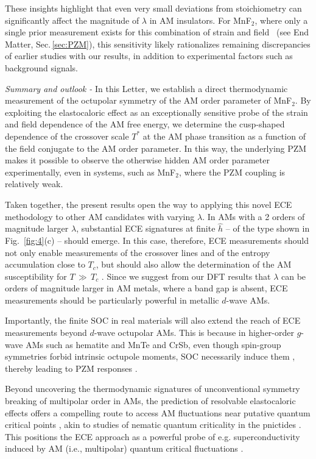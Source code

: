 \documentclass[
 reprint,










 amsmath,amssymb,
 aps,






]{revtex4-2}
\begin{document}
These insights highlight that even very small deviations from stoichiometry can significantly affect the magnitude of $\lambda$ in AM insulators. For MnF$_2$, where only a single prior measurement exists for this combination of strain and field~\cite{Bar88} (see End Matter, Sec.\,\ref{sec:PZM}), this sensitivity likely rationalizes remaining discrepancies of earlier studies with our results, in addition to experimental factors such as background signals.



\textit{Summary and outlook - } In this Letter, we establish a direct thermodynamic measurement of the octupolar symmetry of the AM order parameter of MnF$_2$. By exploiting the elastocaloric effect as an exceptionally sensitive probe of the strain and field dependence of the AM free energy, we determine the cusp-shaped dependence of the crossover scale $T^*$ at the AM phase transition as a function of the field conjugate to the AM order parameter. In this way, the underlying PZM makes it possible to observe the otherwise hidden AM order parameter experimentally, even in systems, such as MnF$_2$, where the PZM coupling is relatively weak.

Taken together, the present results open the way to applying this novel ECE methodology to other AM candidates with varying $\lambda$.  In AMs with a 2 orders of magnitude larger $\lambda$, substantial ECE signatures at finite $\hat{h}$ -- of the type shown in Fig.~\ref{fig:4}(c) -- should emerge. In this case, therefore, ECE measurements should not only enable measurements of the crossover lines and of the entropy accumulation close to $T_c$, but should also allow the determination of the AM susceptibility for $T\,\gg\,T_c$ \cite{Chakarborty2025,Steward25,Ye24}. Since we suggest from our DFT results that $\lambda$ can be orders of magnitude larger in AM metals, where a band gap is absent, ECE measurements should be particularly powerful in metallic $d$-wave AMs.



Importantly, the finite SOC in real materials will also extend the reach of ECE measurements beyond $d$-wave octupolar AMs. This is because in higher-order $g$-wave AMs such as hematite \cite{Verbeek24} and MnTe and CrSb, even though spin-group symmetries forbid intrinsic octupole moments, SOC necessarily induce them \cite{Fernandes2024_AM,Jaeschke2025,Buiarelli2025}, thereby leading to PZM responses \cite{Andratskil67,Aoy24}.

Beyond uncovering the thermodynamic signatures of unconventional symmetry breaking of multipolar order in AMs, the prediction of resolvable elastocaloric effects offers a compelling route to access AM fluctuations near putative quantum critical points \cite{Steward25,Chakarborty2025}, akin to studies of nematic quantum criticality in the pnictides \cite{Ikeda21}. This positions the ECE approach as a powerful probe of e.g. superconductivity \cite{Mazin25} induced by AM (i.e., multipolar) quantum critical fluctuations \cite{Wu2025}.
\end{document}
